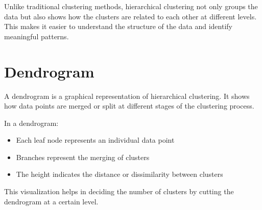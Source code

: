 \documentclass{article}
\begin{document}
Unlike traditional clustering methods, hierarchical clustering not only groups the data but also shows how the clusters are related to each other at different levels. This makes it easier to understand the structure of the data and identify meaningful patterns.

\section{Dendrogram}

A dendrogram is a graphical representation of hierarchical clustering. It shows how data points are merged or split at different stages of the clustering process.

In a dendrogram:
\begin{itemize}
    \item Each leaf node represents an individual data point
    \item Branches represent the merging of clusters
    \item The height indicates the distance or dissimilarity between clusters
\end{itemize}

This visualization helps in deciding the number of clusters by cutting the dendrogram at a certain level.
\end{document}
